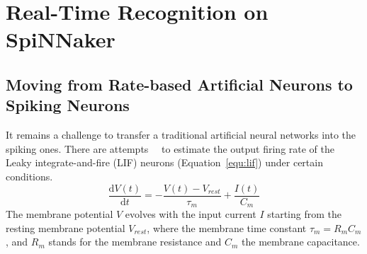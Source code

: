 \documentclass[journal]{journal}
\def\D{\mathrm{d}}
\begin{document}
\section{Real-Time Recognition on SpiNNaker}

\subsection{Moving from Rate-based Artificial Neurons to Spiking Neurons}
It remains a challenge to transfer a traditional artificial neural networks into the spiking ones.
There are attempts~\cite{la2008response}~\cite{burkitt2006review} to estimate the output firing rate of the Leaky integrate-and-fire (LIF) neurons (Equation~\ref{equ:lif}) under certain conditions. 
\begin{equation}
\frac{\D V(t)}{\D t}=-\frac{V(t)-V_\mathit{rest}}{\tau_m}+\frac{I(t)}{C_m}
\label{equ:lif}
\end{equation}
The membrane potential $V$ evolves with the input current $I$ starting from the resting membrane potential  $V_{rest}$, where the membrane time constant $\tau_m = R_mC_m$, and $R_m$ stands for the membrane resistance and $C_m$ the membrane capacitance.
\end{document}
